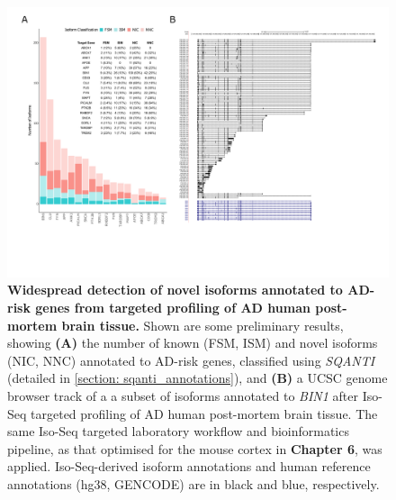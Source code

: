 \begin{landscape}
	\begin{figure}[!htp]
		\centering
		\includegraphics[page=1,trim={1.5cm 3.5cm 2cm 1cm}, scale = 0.85]{Figures/Bin1_ADBDR.pdf}
		\captionsetup{width=1.5\textwidth}
		\caption[Preliminary results from targeted profiling of human post-mortem brain tissue]%
		{\textbf{Widespread detection of novel isoforms annotated to AD-risk genes from targeted profiling of AD human post-mortem brain tissue.} Shown are some preliminary results, showing \textbf{(A)} the number of known (FSM, ISM) and novel isoforms (NIC, NNC) annotated to AD-risk genes, classified using \textit{SQANTI} (detailed in \cref{section: sqanti_annotations}), and \textbf{(B)} a UCSC genome browser track of a a subset of isoforms annotated to \textit{BIN1} after Iso-Seq targeted profiling of AD human post-mortem brain tissue. The same Iso-Seq targeted laboratory workflow and bioinformatics pipeline, as that optimised for the mouse cortex in \textbf{Chapter 6}, was applied. Iso-Seq-derived isoform annotations and human reference annotations (hg38, GENCODE) are in black and blue, respectively.}   
		\label{fig:adbdr}
	\end{figure}	
\end{landscape}   

